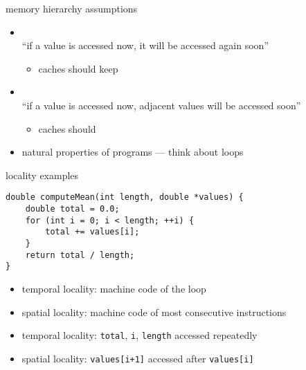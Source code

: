 \begin{frame}[label=localityIntro]{memory hierarchy assumptions}
\begin{itemize}
    \item {} \\
        ``if a value is accessed now, it will be accessed again soon''
        \begin{itemize}
        \item caches should keep 
        \end{itemize}
    \vspace{.5cm}
    \item {} \\
        ``if a value is accessed now, adjacent values will be accessed soon''
        \begin{itemize}
        \item caches should 
        \end{itemize}

    \vspace{1cm}
    \item natural properties of programs --- think about loops
\end{itemize}
\end{frame}

\begin{frame}[fragile,label=localityExamples]{locality examples}
\lstset{language=C,style=small}
\begin{lstlisting}
double computeMean(int length, double *values) {
    double total = 0.0;
    for (int i = 0; i < length; ++i) {
        total += values[i];
    }
    return total / length;
}
\end{lstlisting}
\begin{itemize}
    \item temporal locality: machine code of the loop
    \item spatial locality: machine code of most consecutive instructions
    \item temporal locality: {\tt total}, {\tt i}, {\tt length} accessed repeatedly
    \item spatial locality: {\tt values[i+1]} accessed after {\tt values[i]}
\end{itemize}
\end{frame}
